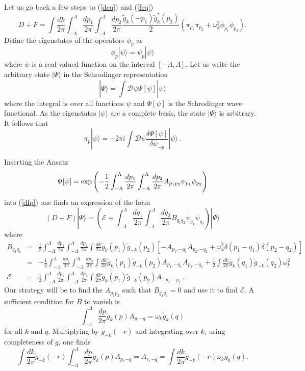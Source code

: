 \def\letter{0}\def\pr{0}\documentclass[a4paper,12pt, epsfig]{article}
\def\exp#1{\hbox{\rm exp}\left(#1\right)}
\renewcommand{\(}{\begin{equation}}
\renewcommand{\)}{end{equation} \vspace{-.05in}\linebreak}
\renewcommand{\=}{\hspace{-.03in}=\hspace{-.02in}}
\renewcommand{\(}{\begin{equation}}
\renewcommand{\)}{\end{equation}}
\renewcommand{\(}{\begin{equation}}
\renewcommand{\)}{\end{equation}}
\def\lpin#1{\int^\Lambda_{-\Lambda} \frac{d#1}{2\pi}}
\def\pin#1{\int \frac{d#1}{2\pi}}
\newcommand{\beq}{\begin{equation}}
\newcommand{\eeq}{\end{equation}}
\newcommand{\bea}{\begin{eqnarray}}
\newcommand{\eea}{\end{eqnarray}}
\begin{document}
Let us go back a few steps to (\ref{deq}) and (\ref{feq})
\beq
D+F=\pin{k}\lpin{p_1}\lpin{p_2} \frac{\tilde{g}_k(-p_1)\tilde{g}^*_k(p_2)}{2}\left(\pi_{p_1}\pi_{p_2}+\omega_{k}^2 \phi_{p_1}\phi_{p_2}
\right).\label{dfp}
\eeq
Define the eigenstates of the operators $\phi_p$ as
\beq
\phi_p|\psi\rangle=\psi_p|\psi\rangle
\eeq
where $\psi$ is a real-valued function on the interval $[-\Lambda,\Lambda]$.  Let us write the arbitrary state $|\Psi\rangle$  in the Schrodinger representation
\beq
|\Psi\rangle=\int \mathcal{D}\psi \Psi[\psi]|\psi\rangle
\eeq
where the integral is over all functions $\psi$ and $\Psi[\psi]$ is the Schrodinger wave functional.  As the eigenstates $|\psi\rangle$ are a complete basis, the state $|\Psi\rangle$ is arbitrary.  It follows that
\beq
\pi_p |\psi \rangle = - 2\pi i \int \mathcal{D}\psi \frac{\delta \Psi[\psi]}{\delta \psi_{-p}} |\psi \rangle~. \label{pi}
\eeq

Inserting the Ansatz
\beq
\Psi[\psi]=\exp{-\frac{1}{2}\lpin{p_1}\lpin{p_2}A_{p_1p_2}\psi_{p_1}\psi_{p_2}} \label{ans}
\eeq
into (\ref{dfp}) one finds an expression of the form
\beq
(D+F)|\Psi\rangle=\left(\mathcal{E}+\lpin{q_1}\lpin{q_2}B_{q_1q_2}\psi_{q_1}\psi_{q_2}\right)|\Psi\rangle
\eeq
where
\bea
B_{q_1q_2}&=&\frac{1}{2}\lpin{p_1}\lpin{p_2}\pin{k}\tilde{g}_k(p_1)\tilde{g}_{-k}(p_2)\left[-A_{p_1,-q_1}A_{p_2,-q_2}+\omega_k^2\delta(p_1-q_1)\delta(p_2-q_2)\right]\nonumber\\
&=&-\frac{1}{2}\lpin{p_1}\lpin{p_2}\pin{k}\tilde{g}_k(p_1)\tilde{g}_{-k}(p_2)A_{p_1,-q_1}A_{p_2,-q_2}+\frac{1}{2}\pin{k}\tilde{g}_k(q_1)\tilde{g}_{-k}(q_2)\omega_k^2\nonumber \\
\mathcal{E}&=&\frac{1}{2}\lpin{p_1}\lpin{p_2}\pin{k}\tilde{g}_k(p_1)\tilde{g}_{-k}(p_2)A_{-p_1,-p_2} ~.
\eea
Our strategy will be to find the $A_{p_1p_2}$ such that $B_{q_1q_2}=0$ and use it to find $\mathcal{E}$.  A sufficient condition for $B$ to vanish is
\beq \label{sufficient}
\lpin{p}\tilde{g}_k(p)A_{p,-q}=\omega_k\tilde{g}_k(q)
\eeq
for all $k$ and $q$. Multiplying by $\tilde{g}_{-k}(-r)$ and integrating over $k$, using completeness of $g$, one finds
\beq
\pin{k}\tilde{g}_{-k}(-r)\lpin{p}\tilde{g}_k(p)A_{p,-q}=A_{r,-q}=\pin{k}\tilde{g}_{-k}(-r)\omega_k\tilde{g}_k(q).
\eeq
\end{document}
